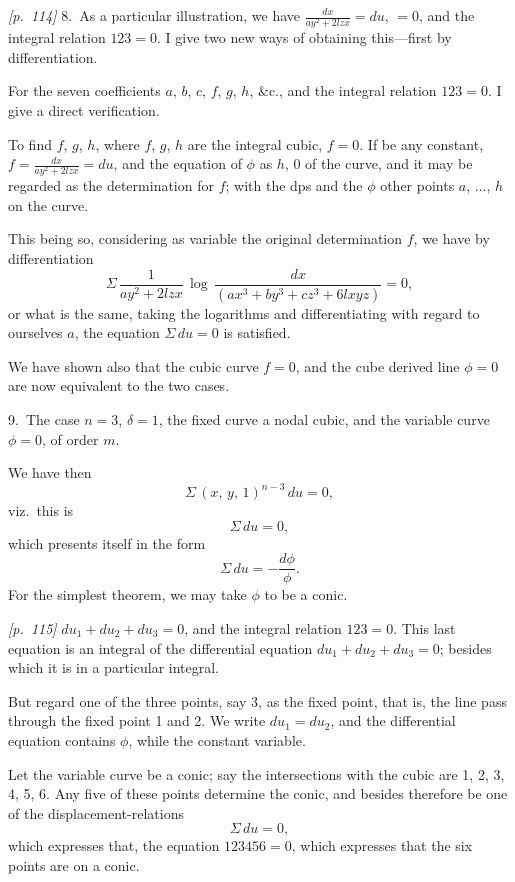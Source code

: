 \documentclass[11pt,a4paper]{book}
\begin{document}
\bigskip\noindent\textit{[p.~114]} 8.\ As a particular illustration, we have $\frac{dx}{ay^2 + 2lzx} = du$, $= 0$, and the integral relation $123 = 0$. I give two new ways of obtaining this---first by differentiation.

For the seven coefficients $a$, $b$, $c$, $f$, $g$, $h$, $\&$c., and the integral relation $123 = 0$. I give a direct verification.

To find $f$, $g$, $h$, where $f$, $g$, $h$ are the integral cubic, $f = 0$. If be any constant, $f = \frac{dx}{ay^2 + 2lzx} = du$, and the equation of $\phi$ as $h$, $0$ of the curve, and it may be regarded as the determination for $f$; with the dps and the $\phi$ other points $a$, ..., $h$ on the curve.

This being so, considering as variable the original determination $f$, we have by differentiation
\[
\Sigma\,\frac{1}{ay^2 + 2lzx}\,\log\,\frac{dx}{(ax^3 + by^3 + cz^3 + 6lxyz)} = 0,
\]
or what is the same, taking the logarithms and differentiating with regard to ourselves $a$, the equation $\Sigma\,du = 0$ is satisfied.

We have shown also that the cubic curve $f = 0$, and the cube derived line $\phi = 0$ are now equivalent to the two cases.

\bigskip

9.\ The case $n = 3$, $\delta = 1$, the fixed curve a nodal cubic, and the variable curve $\phi = 0$, of order $m$.

We have then
\[
\Sigma\,(x,\,y,\,1)^{n-3}\,du = 0,
\]
viz.\ this is
\[
\Sigma\,du = 0,
\]
which presents itself in the form
\[
\Sigma\,du = -\frac{d\phi}{\phi}.
\]
For the simplest theorem, we may take $\phi$ to be a conic.

\bigskip\noindent\textit{[p.~115]} $du_1 + du_2 + du_3 = 0$, and the integral relation $123 = 0$. This last equation is an integral of the differential equation $du_1 + du_2 + du_3 = 0$; besides which it is in a particular integral.

But regard one of the three points, say 3, as the fixed point, that is, the line pass through the fixed point 1 and 2. We write $du_1 = du_2$, and the differential equation contains $\phi$, while the constant variable.

Let the variable curve be a conic; say the intersections with the cubic are 1, 2, 3, 4, 5, 6. Any five of these points determine the conic, and besides therefore be one of the displacement-relations
\[
\Sigma\,du = 0,
\]
which expresses that, the equation $123456 = 0$, which expresses that the six points are on a conic.
\end{document}
